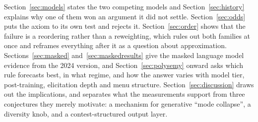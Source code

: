 \documentclass[11pt]{article}
\begin{document}
Section~\ref{sec:models} states the two competing models and
Section~\ref{sec:history} explains why one of them won an argument it did not
settle. Section~\ref{sec:odds} puts the axiom to its own test and rejects it.
Section~\ref{sec:order} shows that the failure is a reordering rather than a
reweighting, which rules out both families at once and reframes everything after
it as a question about approximation. Sections~\ref{sec:masked}
and~\ref{sec:maskedresults} give the masked language model evidence from the
2024 version, and Section~\ref{sec:polysemy} onward asks which rule forecasts
best, in what regime, and how the answer varies with model tier, post-training,
elicitation depth and menu structure.
Section~\ref{sec:discussion} draws out the implications, and separates what the
measurements support from three conjectures they merely motivate: a mechanism
for generative ``mode collapse'', a diversity knob, and a contest-structured
output layer.
\end{document}
